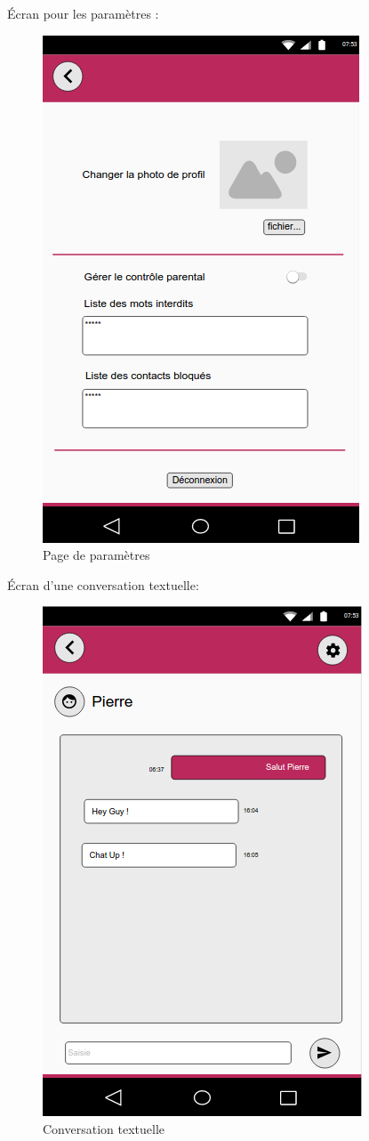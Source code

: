 Écran pour les paramètres : 

	\begin{figure}[H]
		\centering \includegraphics[scale=0.5]{img/Parametres.png}
		\caption{Page de paramètres}
	\end{figure}


Écran d’une conversation textuelle:

	\begin{figure}[H]
		\centering \includegraphics[scale=0.5]{img/Conversation.png}
		\caption{Conversation textuelle}
	\end{figure}

